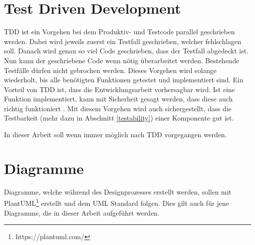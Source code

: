 \section{Test Driven Development} \label{tdd}
\ac{TDD} ist ein Vorgehen bei dem Produktiv- und Testcode parallel geschrieben werden.
Dabei wird jeweils zuerst ein Testfall geschrieben, welcher fehlschlagen soll.
Danach wird genau so viel Code geschrieben, dass der Testfall abgedeckt ist.
Nun kann der geschriebene Code wenn nötig überarbeitet werden.
Bestehende Testfälle dürfen nicht gebrochen werden.
Dieses Vorgehen wird solange wiederholt, bis alle benötigten Funktionen getestet und implementiert sind.
Ein Vorteil von \ac{TDD} ist, dass die Entwicklungsarbeit vorhersagbar wird.
Ist eine Funktion implementiert, kann mit Sicherheit gesagt werden, dass diese auch richtig funktioniert \parencite{beck2003test}.
Mit diesem Vorgehen wird auch sichergestellt, dass die Testbarkeit (mehr dazu in Abschnitt \ref{testability}) einer Komponente gut ist.

In dieser Arbeit soll wenn immer möglich nach \ac{TDD} vorgegangen werden.


\section{Diagramme}
Diagramme, welche während des Designprozesses erstellt werden, sollen mit PlantUML\footnote{https://plantuml.com/} erstellt und dem UML Standard folgen.
Dies gilt auch für jene Diagramme, die in dieser Arbeit aufgeführt werden.